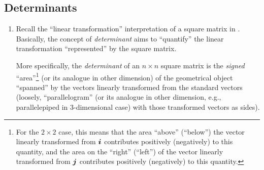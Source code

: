\subsection{Determinants}
\begin{enumerate}
\item \label{it:deter-geo}
Recall the ``linear transformation'' interpretation of a square matrix in
. Basically, the concept of
\emph{determinant} aims to ``quantify'' the linear transformation
``represented'' by the square matrix. 

More specifically, the \emph{determinant} of an \(n\times n\) square matrix is
the \emph{signed} ``area''\footnote{For the \(2\times 2\) case, this means that
the area ``above'' (``below'') the vector linearly transformed from
\(\vb*{i}\) contributes positively (negatively) to this quantity, and the area
on the ``right'' (``left'') of the vector linearly transformed from \(\vb*{j}\)
contributes positively (negatively) to this quantity.} (or its analogue in
other dimension) of the geometrical object ``spanned'' by the vectors linearly
transformed from the standard vectors (loosely, ``parallelogram'' (or its
analogue in other dimension, e.g., parallelepiped in 3-dimensional case) with
those transformed vectors as sides).


\end{enumerate}
